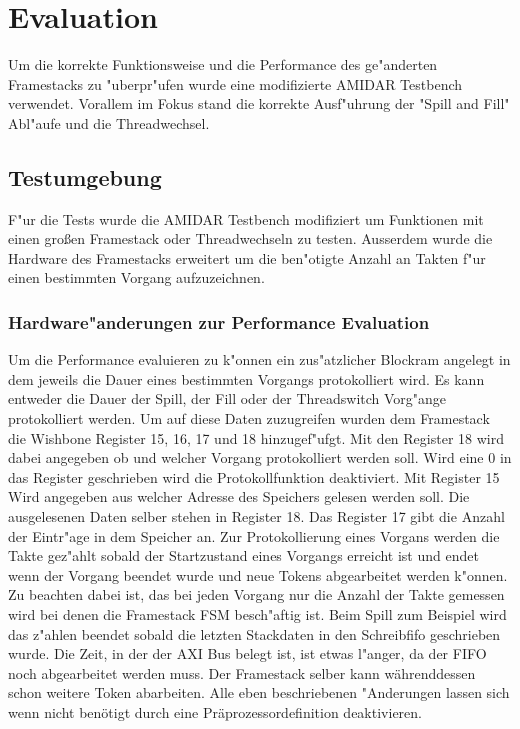 \chapter{Evaluation}
\label{cha:Evaluation}
Um die korrekte Funktionsweise und die Performance des ge"anderten Framestacks zu "uberpr"ufen wurde eine modifizierte AMIDAR Testbench verwendet. Vorallem im Fokus stand die korrekte Ausf"uhrung der "Spill and Fill" Abl"aufe und die Threadwechsel. 
\section{Testumgebung}
F"ur die Tests wurde die AMIDAR Testbench modifiziert um Funktionen mit einen großen Framestack oder Threadwechseln zu testen. Au{ss}erdem wurde die Hardware des Framestacks erweitert um die ben"otigte Anzahl an Takten f"ur einen bestimmten Vorgang aufzuzeichnen. 
\subsection{Hardware"anderungen zur Performance Evaluation}
Um die Performance evaluieren zu k"onnen ein zus"atzlicher Blockram angelegt in dem jeweils die Dauer eines bestimmten Vorgangs protokolliert wird. Es kann entweder die Dauer der Spill, der Fill oder der Threadswitch Vorg"ange protokolliert werden. 
Um auf diese Daten zuzugreifen wurden dem Framestack die Wishbone Register 15, 16, 17 und 18 hinzugef"ufgt. Mit den Register 18 wird dabei angegeben ob und welcher Vorgang protokolliert werden soll. Wird eine 0 in das Register geschrieben wird die Protokollfunktion deaktiviert. Mit Register 15 Wird angegeben aus welcher Adresse des Speichers gelesen werden soll. Die ausgelesenen Daten selber stehen in Register 18. Das Register 17 gibt die Anzahl der Eintr"age in dem Speicher an. 
Zur Protokollierung eines Vorgans werden die Takte gez"ahlt sobald der Startzustand eines Vorgangs erreicht ist und endet wenn der Vorgang beendet wurde und neue Tokens abgearbeitet werden k"onnen. Zu beachten dabei ist, das bei jeden Vorgang nur die Anzahl der Takte gemessen wird bei denen die Framestack FSM besch"aftig ist. Beim Spill zum Beispiel wird das z"ahlen beendet sobald die letzten Stackdaten in den Schreibfifo geschrieben wurde. Die Zeit, in der der AXI Bus belegt ist, ist etwas l"anger, da der FIFO noch abgearbeitet werden muss. Der Framestack selber kann währenddessen schon weitere Token abarbeiten.
Alle eben beschriebenen "Anderungen lassen sich wenn nicht benötigt durch eine Präprozessordefinition deaktivieren. 
